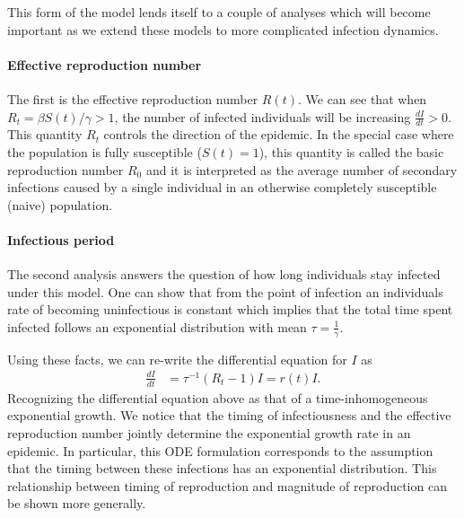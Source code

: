 This form of the model lends itself to a couple of analyses which will become important as we extend these models to more complicated infection dynamics.

\paragraph{Effective reproduction number}%

The first is the effective reproduction number $R(t)$. 
We can see that when $R_{t} = \beta S(t) / \gamma > 1$, the number of infected individuals will be increasing $\frac{dI}{dt} > 0$. 
This quantity $R_{t}$ controls the direction of the epidemic.
In the special case where the population is fully susceptible ($S(t) = 1$), this quantity is called the basic reproduction number $R_{0}$ and it is interpreted as the average number of secondary infections caused by a single individual in an otherwise completely susceptible (naive) population.

\paragraph{Infectious period}

The second analysis answers the question of how long individuals stay infected under this model. One can show that from the point of infection an individuals rate of becoming uninfectious is constant which implies that the total time spent infected follows an exponential distribution with mean $\tau = \frac{1}{\gamma}$.

Using these facts, we can re-write the differential equation for $I$ as
\begin{align}
  \frac{dI}{dt} &= \tau^{-1} (R_{t} - 1)I = r(t) I.
\end{align}
Recognizing the differential equation above as that of a time-inhomogeneous exponential growth. 
We notice that the timing of infectiousness and the effective reproduction number jointly determine the exponential growth rate in an epidemic. 
In particular, this ODE formulation corresponds to the assumption that the timing between these infections has an exponential distribution. 
This relationship between timing of reproduction and magnitude of reproduction can be shown more generally.

